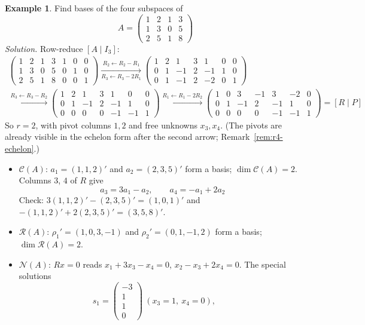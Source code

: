 \documentclass[12pt]{article}
\theoremstyle{definition}
\newtheorem{example}[theorem]{Example}
\begin{document}
\begin{example}\label{exm:r4-four-bases}
Find bases of the four subspaces of
\[
A=\begin{pmatrix}1&2&1&3\\1&3&0&5\\2&5&1&8\end{pmatrix}
\]
\textit{Solution.} Row-reduce \([A\mid I_3]\):
\[
\begin{gathered}
\left(\begin{array}{cccc|ccc}1&2&1&3&1&0&0\\1&3&0&5&0&1&0\\2&5&1&8&0&0&1\end{array}\right)
\xrightarrow[R_3\leftarrow R_3-2R_1]{R_2\leftarrow R_2-R_1}
\left(\begin{array}{cccc|ccc}1&2&1&3&1&0&0\\0&1&-1&2&-1&1&0\\0&1&-1&2&-2&0&1\end{array}\right)
\\
\xrightarrow{R_3\leftarrow R_3-R_2}
\left(\begin{array}{cccc|ccc}1&2&1&3&1&0&0\\0&1&-1&2&-1&1&0\\0&0&0&0&-1&-1&1\end{array}\right)
\xrightarrow{R_1\leftarrow R_1-2R_2}
\left(\begin{array}{cccc|ccc}1&0&3&-1&3&-2&0\\0&1&-1&2&-1&1&0\\0&0&0&0&-1&-1&1\end{array}\right)
=[R\mid P]
\end{gathered}
\]
So \(r=2\), with pivot columns \(1,2\) and free unknowns \(x_3,x_4\). (The pivots are already
visible in the echelon form after the second arrow; Remark~\ref{rem:r4-echelon}.)
\begin{itemize}
\item \(\mathcal C(A)\): \(a_1=(1,1,2)'\) and \(a_2=(2,3,5)'\) form a basis;
\(\dim\mathcal C(A)=2\). Columns \(3\), \(4\) of \(R\) give
\[
a_3=3a_1-a_2,\qquad a_4=-a_1+2a_2
\]
Check: \(3(1,1,2)'-(2,3,5)'=(1,0,1)'\) and \(-(1,1,2)'+2(2,3,5)'=(3,5,8)'\).
\item \(\mathcal R(A)\): \(\rho_1'=(1,0,3,-1)\) and \(\rho_2'=(0,1,-1,2)\) form a basis;
\(\dim\mathcal R(A)=2\).
\item \(\mathcal N(A)\): \(Rx=0\) reads \(x_1+3x_3-x_4=0\), \(x_2-x_3+2x_4=0\). The special
solutions
\[
s_1=\begin{pmatrix}-3\\1\\1\\0\end{pmatrix}\ (x_3=1,\ x_4=0),\qquad
\]
\end{itemize}
\end{example}
\end{document}
